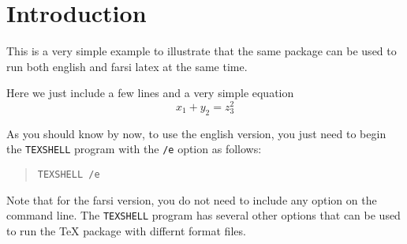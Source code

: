 
\section{Introduction}
This is a very simple example to illustrate that the same
package can be used to run both english and farsi latex
at the same time. 

Here we just include a few lines and a very simple equation
\begin{equation}
x_1+y_2=z_3^2
\end{equation}

As you should know by now, to use the english version, you just
need to begin the {\tt TEXSHELL} program with the {\tt /e} option as
follows:
\begin{quotation}
{\tt TEXSHELL /e }
\end{quotation}

Note that for the farsi version, you do not need to include any
option on the command line.  The {\tt TEXSHELL} program has several 
other options that can be used to run the \TeX{} 
package with differnt format files.


